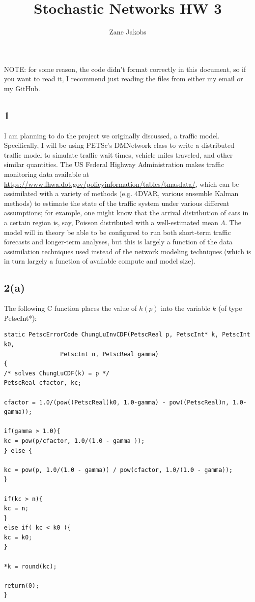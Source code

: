\documentclass[11pt]{article}
\begin{document}
\title{Stochastic Networks HW 3}
\author{Zane Jakobs}
\date{}
\maketitle
NOTE: for some reason, the code didn't format correctly in this document, so if you want to read it, I recommend just reading the files from either my email or my GitHub.
\subsection*{1} I am planning to do the project we originally discussed, a traffic model. Specifically, I will be using PETSc's DMNetwork class to write a distributed traffic model to simulate traffic wait times, vehicle miles traveled, and other similar quantities. The US Federal Highway Administration makes traffic monitoring data available at \url{https://www.fhwa.dot.gov/policyinformation/tables/tmasdata/}, which can be assimilated with a variety of methods (e.g. 4DVAR, various ensemble Kalman methods) to estimate the state of the traffic system under various different assumptions; for example, one might know that the arrival distribution of cars in a certain region is, say, Poisson distributed with a well-estimated mean $\Lambda$. The model will in theory be able to be configured to run both short-term traffic forecasts and longer-term analyses, but this is largely a function of the data assimilation techniques used instead of the network modeling techniques (which is in turn largely a function of available compute and model size).

\subsection*{2(a)} The following C function places the value of $h(p)$ into the variable $k$ (of type PetscInt*):\\
\begin{Verbatim}[xleftmargin=-1cm]
static PetscErrorCode ChungLuInvCDF(PetscReal p, PetscInt* k, PetscInt k0,
				PetscInt n, PetscReal gamma)
{
/* solves ChungLuCDF(k) = p */
PetscReal cfactor, kc;

cfactor = 1.0/(pow((PetscReal)k0, 1.0-gamma) - pow((PetscReal)n, 1.0-gamma));

if(gamma > 1.0){
kc = pow(p/cfactor, 1.0/(1.0 - gamma ));
} else {

kc = pow(p, 1.0/(1.0 - gamma)) / pow(cfactor, 1.0/(1.0 - gamma));
}

if(kc > n){
kc = n;
} 
else if( kc < k0 ){
kc = k0;
}

*k = round(kc);

return(0);
}
\end{Verbatim}
\end{document}
